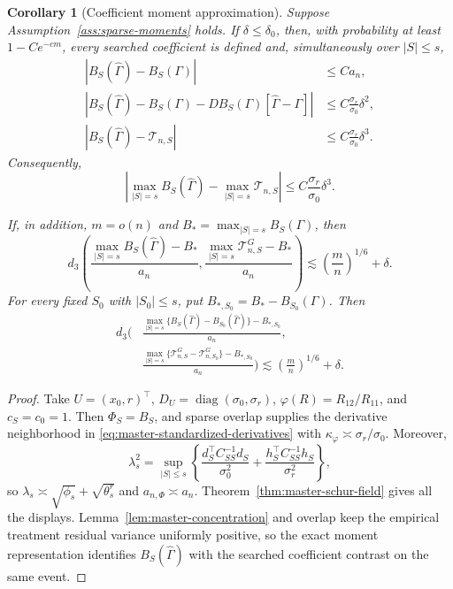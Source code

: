 \documentclass[a4paper,11pt,english]{article}
\newtheorem{corollary}[theorem]{Corollary}
\begin{document}
\begin{corollary}[Coefficient moment approximation]
\label{cor:coefficient-master}
Suppose Assumption~\ref{ass:sparse-moments} holds.
If $\delta\le\delta_0$, then, with probability at least $1-Ce^{-cm}$,
every searched coefficient is defined and, simultaneously over
$|S|\le s$,
\begin{align}
 |B_S(\hat\Gamma)-B_S(\Gamma)|
 &\le Ca_n,
 \label{eq:coefficient-master-uniform}\\
 |B_S(\hat\Gamma)-B_S(\Gamma)
 -DB_S(\Gamma)[\hat\Gamma-\Gamma]|
 &\le C\frac{\sigma_r}{\sigma_0}\delta^2,
 \label{eq:coefficient-master-first-order}\\
 |B_S(\hat\Gamma)-\mathcal T_{n,S}|
 &\le C\frac{\sigma_r}{\sigma_0}\delta^3.
 \label{eq:coefficient-master-second-order}
\end{align}
Consequently,
\begin{equation}\label{eq:coefficient-master-critical-maximum}
 \left|\max_{|S|=s}B_S(\hat\Gamma)
 -\max_{|S|=s}\mathcal T_{n,S}\right|
 \le C\frac{\sigma_r}{\sigma_0}\delta^3.
\end{equation}

If, in addition, $m=o(n)$ and
$B_*=\max_{|S|=s}B_S(\Gamma)$, then
\begin{equation}\label{eq:coefficient-master-matched}
 d_3\left(
 \frac{\max_{|S|=s}B_S(\hat\Gamma)-B_*}{a_n},
 \frac{\max_{|S|=s}\mathcal T^G_{n,S}-B_*}{a_n}
 \right)
 \lesssim\left(\frac mn\right)^{1/6}+\delta.
\end{equation}
For every fixed $S_0$ with $|S_0|\le s$, put
$B_{*,S_0}=B_*-B_{S_0}(\Gamma)$.  Then
\begin{equation}\label{eq:coefficient-master-anchored}
\begin{split}
 d_3\bigg(&
 \frac{\max_{|S|=s}
 \{B_S(\hat\Gamma)-B_{S_0}(\hat\Gamma)\}-B_{*,S_0}}{a_n},\\
 &\frac{\max_{|S|=s}
 \{\mathcal T^G_{n,S}-\mathcal T^G_{n,S_0}\}-B_{*,S_0}}{a_n}
 \bigg)
 \lesssim\left(\frac mn\right)^{1/6}+\delta.
\end{split}
\end{equation}
\end{corollary}

\begin{proof}
Take $U=(x_0,r)^\top$,
$D_U=\operatorname{diag}(\sigma_0,\sigma_r)$,
$\varphi(R)=R_{12}/R_{11}$, and $c_S=c_0=1$.  Then
$\Phi_S=B_S$, and sparse overlap supplies the derivative neighborhood in
\eqref{eq:master-standardized-derivatives} with
$\kappa_\varphi\asymp\sigma_r/\sigma_0$.  Moreover,
\[
 \lambda_s^2
 =\sup_{|S|\le s}\left\{
 \frac{d_S^\top C_{SS}^{-1}d_S}{\sigma_0^2}
 +\frac{h_S^\top C_{SS}^{-1}h_S}{\sigma_r^2}
 \right\},
\]
so $\lambda_s\asymp\sqrt{\phi_s}+\sqrt{\theta_s^r}$ and
$a_{n,\Phi}\asymp a_n$.  Theorem~\ref{thm:master-schur-field} gives all
the displays.  Lemma~\ref{lem:master-concentration} and overlap keep the
empirical treatment residual variance uniformly positive, so the exact
moment representation identifies $B_S(\hat\Gamma)$ with the searched
coefficient contrast on the same event.
\end{proof}
\end{document}
